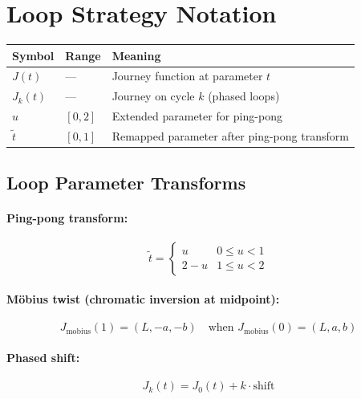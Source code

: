 \section{Loop Strategy Notation}
\label{sec:notation-loops}

\begin{center}
\begin{tabular}{lll}
  \toprule
  \textbf{Symbol} & \textbf{Range} & \textbf{Meaning} \\
  \midrule
  $J(t)$ & --- & Journey function at parameter $t$ \\
  $J_k(t)$ & --- & Journey on cycle $k$ (phased loops) \\
  $u$ & $[0, 2]$ & Extended parameter for ping-pong \\
  $\tilde{t}$ & $[0, 1]$ & Remapped parameter after ping-pong transform \\
  \bottomrule
\end{tabular}
\end{center}

\subsection{Loop Parameter Transforms}

\paragraph{Ping-pong transform:}
\begin{equation*}
    \tilde{t} = \begin{cases}
        u & 0 \leq u < 1 \\
        2 - u & 1 \leq u < 2
    \end{cases}
\end{equation*}

\paragraph{Möbius twist (chromatic inversion at midpoint):}
\begin{equation*}
    J_{\text{mobius}}(1) = (L, -a, -b) \quad \text{when } J_{\text{mobius}}(0) = (L, a, b)
\end{equation*}

\paragraph{Phased shift:}
\begin{equation*}
    J_k(t) = J_0(t) + k \cdot \text{shift}
\end{equation*}

